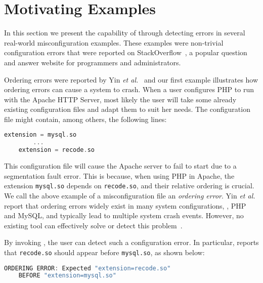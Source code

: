 \section{Motivating Examples}
\label{sec-motiv}

In this section we present the capability of \app through 
detecting errors in several real-world misconfiguration examples. 
These examples were non-trivial configuration errors
that were reported on StackOverflow~\cite{stackoverflow},
a popular question and answer website for programmers and administrators. 

Ordering errors were reported by Yin {\em et al.}~\cite{yin11anempirical} and our first
example illustrates how ordering errors can cause a system to crash. When a user configures PHP 
to run with the
Apache HTTP Server, most likely the user will take some already existing configuration files and adapt them
to suit her needs. The configuration file might contain, among others, 
the following lines:

\begin{lstlisting}[language=C, xleftmargin=.01\textwidth]
    extension = mysql.so
        ...
    extension = recode.so
\end{lstlisting}

This configuration file will cause the Apache server to 
fail to start due to a segmentation fault error. 
This is because, when using PHP in Apache, the extension {\tt mysql.so} 
depends on {\tt recode.so}, and their relative ordering
is crucial. 
We call the above example of a misconfiguration file
an {\em ordering error}.
Yin {\em et al.} report that ordering errors widely exist in
many system configurations, \eg, PHP and MySQL,
and typically lead to multiple system crash events.
However, no existing tool can effectively solve 
or detect this problem~\cite{zhang14encore, xu15systems, xu13do}.

By invoking \app, the user can detect such a configuration error.
In particular, \app reports that {\tt recode.so} 
should appear before {\tt mysql.so}, as shown
below:
 
\begin{lstlisting}[language=C, xleftmargin=.01\textwidth]
    ORDERING ERROR: Expected "extension=recode.so"
    BEFORE "extension=mysql.so"
\end{lstlisting} 

